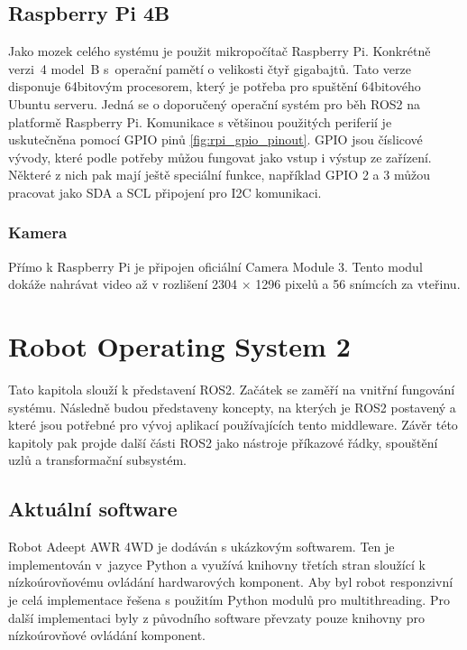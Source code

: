 \section{Raspberry Pi 4B}
Jako mozek celého systému je použit mikropočítač Raspberry Pi. Konkrétně verzi~4 model~B s~operační pamětí o velikosti čtyř gigabajtů. Tato verze disponuje 64bitovým procesorem, který je potřeba pro spuštění 64bitového Ubuntu serveru. Jedná se o doporučený operační systém pro běh ROS2 na platformě Raspberry Pi.
Komunikace s většinou použitých periferií je uskutečněna pomocí GPIO pinů \ref{fig:rpi_gpio_pinout}. GPIO jsou číslicové vývody, které podle potřeby můžou fungovat jako vstup i výstup ze zařízení. Některé z nich pak mají ještě speciální funkce, například GPIO 2 a 3 můžou pracovat jako SDA a SCL připojení pro I2C komunikaci. \cite{rpi_documentation}

\subsection*{Kamera}
Přímo k Raspberry Pi je připojen oficiální Camera Module 3. Tento modul dokáže nahrávat video až v rozlišení 2304 × 1296 pixelů a 56 snímcích za vteřinu. \cite{rpi_documentation}

\chapter{Robot Operating System 2}
Tato kapitola slouží k představení ROS2. Začátek se zaměří na vnitřní fungování systému. Následně budou představeny koncepty, na kterých je ROS2 postavený a které jsou potřebné pro vývoj aplikací používajících tento middleware. Závěr této kapitoly pak projde další části ROS2 jako nástroje příkazové řádky, spouštění uzlů a transformační subsystém.

\section{Aktuální software}
Robot Adeept AWR 4WD je dodáván s ukázkovým softwarem. Ten je implementován v~jazyce Python a využívá knihovny třetích stran sloužící k nízkoúrovňovému ovládání hardwarových komponent. Aby byl robot responzivní je celá implementace řešena s použitím Python modulů pro multithreading. Pro další implementaci byly z původního software převzaty pouze knihovny pro nízkoúrovňové ovládání komponent.

